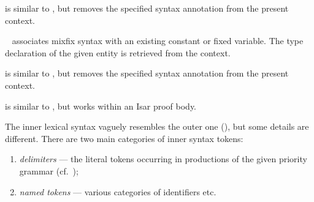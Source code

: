 \begin{isabellebody}
\begin{isamarkuptext}
\begin{description}
  \item \hyperlink{command.no-type-notation}{\mbox{}} is similar to \hyperlink{command.type-notation}{\mbox{}}, but removes the specified syntax annotation from
  the present context.

  \item \hyperlink{command.notation}{\mbox{}}~ associates mixfix
  syntax with an existing constant or fixed variable.  The type
  declaration of the given entity is retrieved from the context.

  \item \hyperlink{command.no-notation}{\mbox{}} is similar to \hyperlink{command.notation}{\mbox{}},
  but removes the specified syntax annotation from the present
  context.

  \item \hyperlink{command.write}{\mbox{}} is similar to \hyperlink{command.notation}{\mbox{}}, but
  works within an Isar proof body.

  \end{description}%
\end{isamarkuptext}%
\isamarkuptrue%
%
\isamarkuptrue%
%
\isamarkuptrue%
%
\begin{isamarkuptext}%
The inner lexical syntax vaguely resembles the outer one
  (), but some details are different.  There are
  two main categories of inner syntax tokens:

  \begin{enumerate}

  \item \emph{delimiters} --- the literal tokens occurring in
  productions of the given priority grammar (cf.\
  );

  \item \emph{named tokens} --- various categories of identifiers etc.

  \end{enumerate}


\end{isamarkuptext}
\end{isabellebody}
